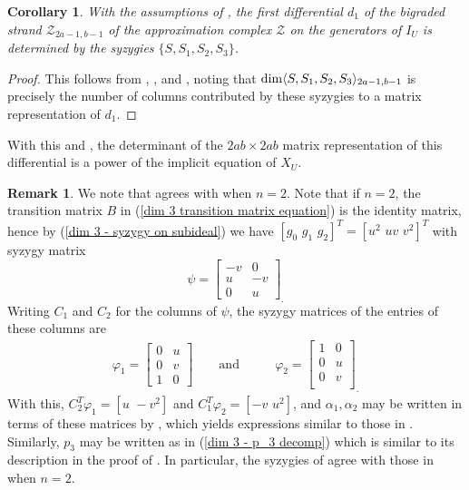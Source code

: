 \documentclass[reqno]{amsart}
\newtheorem{cor}[thm]{Corollary}
\numberwithin{equation}{section}
\theoremstyle{definition}
\newtheorem{rem}[thm]{Remark}
\def\Z{\mathcal{Z}}
\def\dim{\mathop{\rm dim}}
\begin{document}
\begin{cor}
With the assumptions of , the first differential $d_1$ of the bigraded strand $\Z_{2a-1,b-1}$ of the approximation complex $\Z$ on the generators of $I_U$ is determined by the syzygies $\{S,S_1,S_2,S_3\}$. 
\end{cor}

\begin{proof}
This follows from , , and , noting that $\dim \langle S,S_1,S_2,S_3\rangle_{2a-1,b-1}$ is precisely the number of columns contributed by these syzygies to a matrix representation of $d_1$.
\end{proof}

With this and , the determinant of the $2ab\times 2ab$ matrix representation of this differential is a power of the implicit equation of $X_U$.





\begin{rem}
We note that  agrees with \cite[5.4]{Weaver25} when $n=2$. Note that if $n=2$, the transition matrix $B$ in (\ref{dim 3 transition matrix equation}) is the identity matrix, hence by (\ref{dim 3 - syzygy on subideal}) we have $[g_0\,\,g_1\,\,g_2]^T = [u^2\,\,uv\,\,v^2]^T$ with syzygy matrix
\[
\psi = \left[
\begin{array}{cc}
-v  & 0 \\
u  & -v\\
0  & u
\end{array}
\right]_.
\]
Writing $C_1$ and $C_2$ for the columns of $\psi$, the syzygy matrices of the entries of these columns are
\[
\begin{array}{cc}
   \varphi_1=\left[
   \begin{array}{ccc}
   0&u\\
   0&v\\
   1&0
   \end{array}
   \right]\quad\quad \text{and}\quad\quad
   &\varphi_2=\left[
   \begin{array}{cc}
   1&0\\
   0&u\\
   0&v\\
   \end{array}
   \right]_.
\end{array}
\]
With this, $C_2^T\varphi_1 =[u\,\,-v^2]$ and $C_1^T\varphi_2=[-v\,\,u^2]$, and $\alpha_1, \alpha_2$ may be written in terms of these matrices by , which yields expressions similar to those in \cite[5.2]{Weaver25}. Similarly, $p_3$ may be written as in (\ref{dim 3 - p_3 decomp}) which is similar to its description in the proof of \cite[5.4]{Weaver25}. In particular, the syzygies of  agree with those in \cite[5.4]{Weaver25} when $n=2$.
\end{rem}
\end{document}
